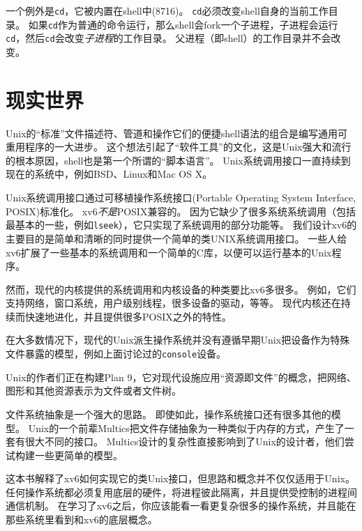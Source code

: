 一个例外是\texttt{cd}，它被内置在shell中(8716)。
\texttt{cd}必须改变shell自身的当前工作目录。
如果\texttt{cd}作为普通的命令运行，那么shell会fork一个子进程，子进程会运行\texttt{cd}，然后\texttt{cd}会改变\emph{子进程}的工作目录。
父进程（即shell）的工作目录并不会改变。

\section{现实世界}
Unix的“标准”文件描述符、管道和操作它们的便捷shell语法的组合是编写通用可重用程序的一大进步。
这个想法引起了“软件工具”的文化，这是Unix强大和流行的根本原因，shell也是第一个所谓的“脚本语言”。
Unix系统调用接口一直持续到现在的系统中，例如BSD、Linux和Mac OS X。

Unix系统调用接口通过可移植操作系统接口(Portable Operating System Interface, POSIX)标准化。
xv6\emph{不是}POSIX兼容的。
因为它缺少了很多系统系统调用（包括最基本的一些，例如\texttt{lseek}），它只实现了系统调用的部分功能等。
我们设计xv6的主要目的是简单和清晰的同时提供一个简单的类UNIX系统调用接口。
一些人给xv6扩展了一些基本的系统调用和一个简单的C库，以便可以运行基本的Unix程序。

然而，现代的内核提供的系统调用和内核设备的种类要比xv6多很多。
例如，它们支持网络，窗口系统，用户级别线程，很多设备的驱动，等等。
现代内核还在持续而快速地进化，并且提供很多POSIX之外的特性。

在大多数情况下，现代的Unix派生操作系统并没有遵循早期Unix把设备作为特殊文件暴露的模型，例如上面讨论过的\texttt{console}设备。

Unix的作者们正在构建Plan 9，它对现代设施应用“资源即文件”的概念，把网络、图形和其他资源表示为文件或者文件树。

文件系统抽象是一个强大的思路。
即使如此，操作系统接口还有很多其他的模型。
Unix的一个前辈Multics把文件存储抽象为一种类似于内存的方式，产生了一套有很大不同的接口。
Multics设计的复杂性直接影响到了Unix的设计者，他们尝试构建一些更简单的模型。

这本书解释了xv6如何实现它的类Unix接口，但思路和概念并不仅仅适用于Unix。
任何操作系统都必须复用底层的硬件，将进程彼此隔离，并且提供受控制的进程间通信机制。
在学习了xv6之后，你应该能看一看更复杂很多的操作系统，并且能在那些系统里看到和xv6的底层概念。
